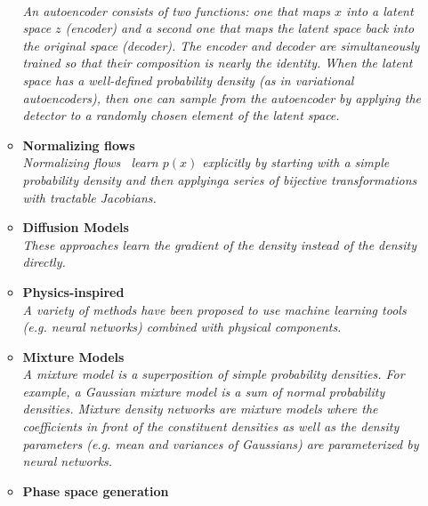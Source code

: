 \documentclass[12pt,letterpaper]{article}
\begin{document}
\begin{itemize}
\begin{itemize}
		\\\textit{An autoencoder consists of two functions: one that maps $x$ into a latent space $z$ (encoder) and a second one that maps the latent space back into the original space (decoder).  The encoder and decoder are simultaneously trained so that their composition is nearly the identity.  When the latent space has a well-defined probability density (as in variational autoencoders), then one can sample from the autoencoder by applying the detector to a randomly chosen element of the latent space.}
\item \textbf{Normalizing flows}~\cite{Albergo:2019eim,Kanwar:2003.06413,Brehmer:2020vwc,Bothmann:2020ywa,Gao:2020zvv,Gao:2020vdv,Nachman:2020lpy,Choi:2020bnf,Lu:2020npg,Bieringer:2020tnw,Hollingsworth:2021sii,Winterhalder:2021ave,Krause:2021ilc,Hackett:2021idh,Menary:2021tjg,Hallin:2021wme,NEURIPS2020_a878dbeb,Vandegar:2020yvw,Jawahar:2021vyu,Bister:2021arb,Krause:2021wez,Butter:2021csz,Butter:2022lkf,Verheyen:2022tov,Leigh:2022lpn,Krause:2022jna}
		\\\textit{Normalizing flows~\cite{pmlr-v37-rezende15} learn $p(x)$ explicitly by starting with a simple probability density and then applyinga series of bijective transformations with tractable Jacobians.}
\item \textbf{Diffusion Models}~\cite{Mikuni:2022xry}
		\\\textit{These approaches learn the gradient of the density instead of the density directly.}
		\item \textbf{Physics-inspired}~\cite{Andreassen:2018apy,Andreassen:2019txo,1808876,Lai:2020byl,Barenboim:2021vzh}
		\\\textit{A variety of methods have been proposed to use machine learning tools (e.g. neural networks) combined with physical components.}
		\item \textbf{Mixture Models}~\cite{Chen:2020uds,Burton:2021tsd,Graziani:2021vai}
		\\\textit{A mixture model is a superposition of simple probability densities.  For example, a Gaussian mixture model is a sum of normal probability densities.  Mixture density networks are mixture models where the coefficients in front of the constituent densities as well as the density parameters (e.g. mean and variances of Gaussians) are parameterized by neural networks.}
		\item \textbf{Phase space generation}~\cite{Bendavid:2017zhk,Bothmann:2020ywa,Gao:2020zvv,Gao:2020vdv,Klimek:2018mza,Carrazza:2020rdn,Nachman:2020fff,Chen:2020nfb,Verheyen:2020bjw,Backes:2020vka,Danziger:2021eeg,Yoon:2020zmb,Maitre:2022xle,Jinno:2022sbr}

\end{itemize}
\end{itemize}
\end{document}
